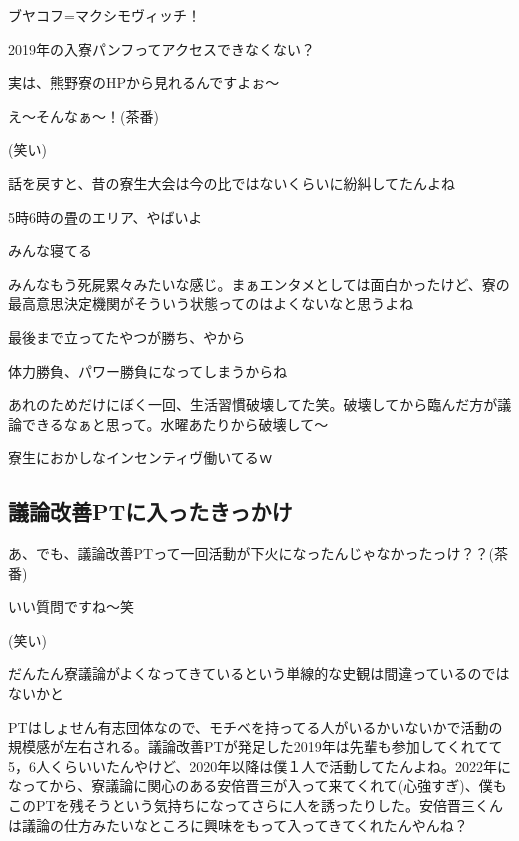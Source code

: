 \begin{multicols}{2}
ブヤコフ=マクシモヴィッチ！

2019年の入寮パンフってアクセスできなくない？

実は、熊野寮のHPから見れるんですよぉ〜


え〜そんなぁ〜！(茶番)

(笑い)

話を戻すと、昔の寮生大会は今の比ではないくらいに紛糾してたんよね

5時6時の畳のエリア、やばいよ

みんな寝てる

みんなもう死屍累々みたいな感じ。まぁエンタメとしては面白かったけど、寮の最高意思決定機関がそういう状態ってのはよくないなと思うよね

最後まで立ってたやつが勝ち、やから

体力勝負、パワー勝負になってしまうからね

あれのためだけにぼく一回、生活習慣破壊してた笑。破壊してから臨んだ方が議論できるなぁと思って。水曜あたりから破壊して〜

寮生におかしなインセンティヴ働いてるｗ

\subsection{議論改善PTに入ったきっかけ}

あ、でも、議論改善PTって一回活動が下火になったんじゃなかったっけ？？(茶番)

いい質問ですね〜笑

(笑い)

だんたん寮議論がよくなってきているという単線的な史観は間違っているのではないかと

PTはしょせん有志団体なので、モチベを持ってる人がいるかいないかで活動の規模感が左右される。議論改善PTが発足した2019年は先輩も参加してくれてて5，6人くらいいたんやけど、2020年以降は僕１人で活動してたんよね。2022年になってから、寮議論に関心のある安倍晋三が入って来てくれて(心強すぎ)、僕もこのPTを残そうという気持ちになってさらに人を誘ったりした。安倍晋三くんは議論の仕方みたいなところに興味をもって入ってきてくれたんやんね？


\end{multicols}
